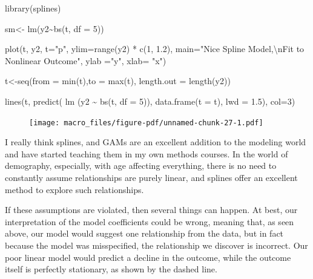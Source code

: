 \documentclass[
  letterpaper,
  DIV=11,
  numbers=noendperiod]{scrreprt}
\newenvironment{Shaded}{\begin{snugshade}}{\end{snugshade}}
\newcommand{\AttributeTok}[1]{\textcolor[rgb]{0.40,0.45,0.13}{#1}}
\newcommand{\DecValTok}[1]{\textcolor[rgb]{0.68,0.00,0.00}{#1}}
\newcommand{\FloatTok}[1]{\textcolor[rgb]{0.68,0.00,0.00}{#1}}
\newcommand{\FunctionTok}[1]{\textcolor[rgb]{0.28,0.35,0.67}{#1}}
\newcommand{\NormalTok}[1]{\textcolor[rgb]{0.00,0.23,0.31}{#1}}
\newcommand{\OtherTok}[1]{\textcolor[rgb]{0.00,0.23,0.31}{#1}}
\newcommand{\SpecialCharTok}[1]{\textcolor[rgb]{0.37,0.37,0.37}{#1}}
\newcommand{\StringTok}[1]{\textcolor[rgb]{0.13,0.47,0.30}{#1}}
\begin{document}
\begin{Shaded}
\begin{Highlighting}[]
\FunctionTok{library}\NormalTok{(splines)}

\NormalTok{sm}\OtherTok{\textless{}{-}} \FunctionTok{lm}\NormalTok{(y2}\SpecialCharTok{\textasciitilde{}}\FunctionTok{bs}\NormalTok{(t, }\AttributeTok{df =} \DecValTok{5}\NormalTok{))}

\FunctionTok{plot}\NormalTok{(t, y2, }\AttributeTok{t=}\StringTok{"p"}\NormalTok{,}
     \AttributeTok{ylim=}\FunctionTok{range}\NormalTok{(y2) }\SpecialCharTok{*} \FunctionTok{c}\NormalTok{(}\DecValTok{1}\NormalTok{, }\FloatTok{1.2}\NormalTok{),}
     \AttributeTok{main=}\StringTok{"Nice Spline Model,}\SpecialCharTok{\textbackslash{}n}\StringTok{Fit to Nonlinear Outcome"}\NormalTok{,}
     \AttributeTok{ylab =}\StringTok{"y"}\NormalTok{,}
     \AttributeTok{xlab=} \StringTok{"x"}\NormalTok{)}

\NormalTok{t}\OtherTok{\textless{}{-}}\FunctionTok{seq}\NormalTok{(}\AttributeTok{from =} \FunctionTok{min}\NormalTok{(t),}\AttributeTok{to =} \FunctionTok{max}\NormalTok{(t), }\AttributeTok{length.out =} \FunctionTok{length}\NormalTok{(y2))}

\FunctionTok{lines}\NormalTok{(t, }\FunctionTok{predict}\NormalTok{( }\FunctionTok{lm}\NormalTok{ (y2 }\SpecialCharTok{\textasciitilde{}} \FunctionTok{bs}\NormalTok{(t, }\AttributeTok{df =} \DecValTok{5}\NormalTok{)),}
                 \FunctionTok{data.frame}\NormalTok{(}\AttributeTok{t =}\NormalTok{ t), }\AttributeTok{lwd =} \FloatTok{1.5}\NormalTok{),}
      \AttributeTok{col=}\DecValTok{3}\NormalTok{)}
\end{Highlighting}
\end{Shaded}

\begin{figure}[H]

{\centering \texttt{[image: macro\_files/figure-pdf/unnamed-chunk-27-1.pdf]}

}

\end{figure}

I really think splines, and GAMs are an excellent addition to the
modeling world and have started teaching them in my own methods courses.
In the world of demography, especially, with age affecting everything,
there is no need to constantly assume relationships are purely linear,
and splines offer an excellent method to explore such relationships.

If these assumptions are violated, then several things can happen. At
best, our interpretation of the model coefficients could be wrong,
meaning that, as seen above, our model would suggest one relationship
from the data, but in fact because the model was misspecified, the
relationship we discover is incorrect. Our poor linear model would
predict a decline in the outcome, while the outcome itself is perfectly
stationary, as shown by the dashed line.
\end{document}
